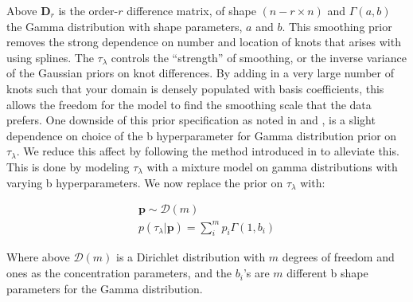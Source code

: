 \noindent Above $\bm{D}_r$ is the order-$r$ difference matrix, of shape $(n-r \times n)$ and $\Gamma(a,b)$ the Gamma distribution with shape parameters, $a$ and $b$. 
This smoothing prior removes the strong dependence on number and location of knots that arises with using splines. The $\tau_\lambda$ controls the ``strength'' of 
smoothing, or the inverse variance of the Gaussian priors on knot differences. By adding in a very large number 
of knots such that your domain is densely populated with basis coefficients, this allows the freedom for the model to find the smoothing 
scale that the data prefers. One downside of this prior specification as noted in \citet{BayesianPSplines} and \citet{Jullion2007RobustSO}, is a slight dependence on choice 
of the b hyperparameter for Gamma distribution prior on $\tau_\lambda$. We reduce this affect by following the method introduced in \citet{Jullion2007RobustSO}
to alleviate this. This is done by modeling $\tau_\lambda$ with a mixture model on gamma distributions with varying b hyperparameters. 
We now replace the prior on $\tau_\lambda$ with:

\begin{align}
    \bm{p} \sim \mathcal{D}(m) \\
    p(\tau_\lambda | \bm{p}) = \sum_i^m p_i \Gamma(1, b_i)
\end{align}

\noindent Where above $\mathcal{D}(m)$ is a Dirichlet distribution with $m$ degrees of freedom and ones as the concentration parameters, 
and the $b_i$'s are $m$ different b shape parameters for the Gamma distribution.




